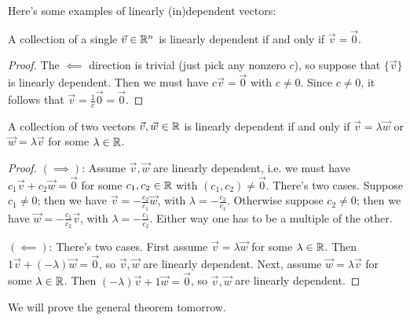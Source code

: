 \documentclass[main.tex]{subfiles}
\begin{document}
Here's some examples of linearly (in)dependent vectors:
\begin{example}
    A collection of a single $\vec{v}\in \mathbb R^n$ is linearly dependent if and only if $\vec{v} = \vec{0}$.
\end{example}

\begin{proof}
    The $\impliedby$ direction is trivial (just pick any nonzero $c$), so suppose that $\{\vec{v}\}$ is linearly dependent. Then we must have $c\vec{v} = \vec{0}$ with $c\neq 0$. Since $c\neq 0$, it follows that $\vec{v} = \frac{1}{c}\vec{0} = \vec{0}$.
\end{proof}

\begin{example}
    A collection of two vectors $\vec{v}, \vec{w}\in \mathbb R$ is linearly dependent if and only if $\vec{v} = \lambda \vec{w}$ or $\vec{w} = \lambda\vec{v}$ for some $\lambda \in \mathbb R$.
\end{example}

\begin{proof}
    $(\implies)$: Assume $\vec{v}, \vec{w}$ are linearly dependent, i.e. we must have $c_1\vec{v} + c_2\vec{w} = \vec{0}$ for some $c_1, c_2\in \mathbb R$ with $(c_1, c_2)\neq \vec{0}$. There's two cases. Suppose $c_1\neq 0$; then we have $\vec{v} = -\frac{c_2}{c_1}\vec{w}$, with $\lambda = -\frac{c_2}{c_1}$. Otherwise suppose $c_2\neq 0$; then we have $\vec{w} = -\frac{c_1}{c_2}\vec{v}$, with $\lambda = -\frac{c_1}{c_2}$. Either way one has to be a multiple of the other.

    $(\impliedby)$: There's two cases. First assume $\vec{v} = \lambda\vec{w}$ for some $\lambda\in \mathbb R$. Then $1\vec{v} + (-\lambda)\vec{w} = \vec{0}$, so $\vec{v}, \vec{w}$ are linearly dependent. Next, assume $\vec{w} = \lambda\vec{v}$ for some $\lambda\in \mathbb R$. Then $(-\lambda)\vec{v} + 1\vec{w} = \vec{0}$, so $\vec{v}, \vec{w}$ are linearly dependent.
\end{proof}

We will prove the general theorem tomorrow.
\end{document}
